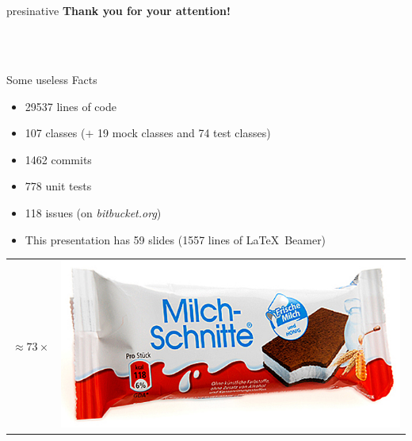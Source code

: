 \documentclass[hyperref={pdfpagelabels=false},compress]{beamer}
\begin{document}
\section{}
\begin{frame}
	\hfill
	\begin{beamercolorbox}[shadow=true, rounded=true, wd=10cm]{presinative}
		\centering
		\Large{\textbf{Thank you for your attention!}}
	\end{beamercolorbox}
	\hfill \\
	\hfill \\
	\begin{block}{Some useless Facts}
		\begin{itemize}
			\item 29537 lines of code					%
			\item 107 classes ($+$ 19 mock classes and 74 test classes)	%
			\item 1462 commits						%
			\item 778 unit tests
			\item 118 issues (on \textit{bitbucket.org})
			\item This presentation has 59 slides (1557 lines of \LaTeX\ Beamer)
		\end{itemize}
	\end{block}

	\begin{center}
		\begin{tabularx}{4.5cm}{m{1.5cm}m{1.5cm}}
			$\approx 73 \times$ & \includegraphics[scale=0.07]{milchschnitte.png}
		\end{tabularx}
	\end{center}
\end{frame}
\end{document}
